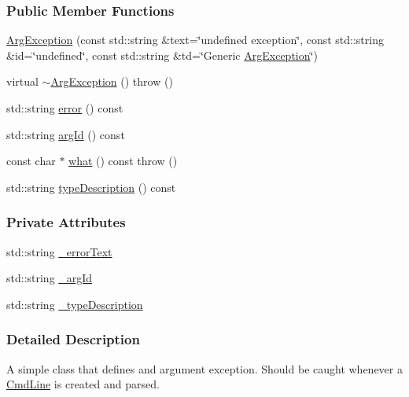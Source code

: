 \subsubsection*{Public Member Functions}
\begin{DoxyCompactItemize}
\item 
\hyperlink{classTCLAP_1_1ArgException_a67389912b628e95d530f8bb8de97b309}{Arg\+Exception} (const std\+::string \&text=\char`\"{}undefined exception\char`\"{}, const std\+::string \&id=\char`\"{}undefined\char`\"{}, const std\+::string \&td=\char`\"{}Generic \hyperlink{classTCLAP_1_1ArgException}{Arg\+Exception}\char`\"{})
\item 
virtual \hyperlink{classTCLAP_1_1ArgException_a5c5df6a814b05c623a01607fb82980f4}{$\sim$\+Arg\+Exception} ()  throw ()
\item 
std\+::string \hyperlink{classTCLAP_1_1ArgException_a0656dab88a7129bc288821bacd653d08}{error} () const 
\item 
std\+::string \hyperlink{classTCLAP_1_1ArgException_a18ffd1ad34c1799865f8e03df4ebdff1}{arg\+Id} () const 
\item 
const char $\ast$ \hyperlink{classTCLAP_1_1ArgException_af51c89da2e4ae54fc9d05038ea484c83}{what} () const   throw ()
\item 
std\+::string \hyperlink{classTCLAP_1_1ArgException_abd271955e1b808bb92f8db7a16ea7c95}{type\+Description} () const 
\end{DoxyCompactItemize}
\subsubsection*{Private Attributes}
\begin{DoxyCompactItemize}
\item 
std\+::string \hyperlink{classTCLAP_1_1ArgException_ad94d68e5948f6b74aacb8b2023e96c50}{\+\_\+error\+Text}
\item 
std\+::string \hyperlink{classTCLAP_1_1ArgException_a6bfa7ed4e5cc1404d6b4cc5d28cb1f28}{\+\_\+arg\+Id}
\item 
std\+::string \hyperlink{classTCLAP_1_1ArgException_a7c69e599ae4a5b874a3e19cd4cf7c910}{\+\_\+type\+Description}
\end{DoxyCompactItemize}


\subsubsection{Detailed Description}
A simple class that defines and argument exception. Should be caught whenever a \hyperlink{classTCLAP_1_1CmdLine}{Cmd\+Line} is created and parsed. 

